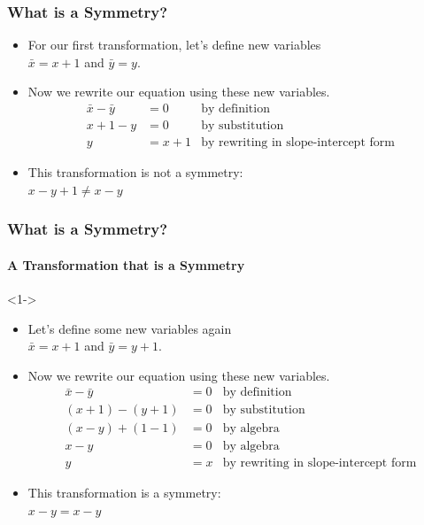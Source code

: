 \documentclass{beamer}
\begin{document}
\begin{frame}
    \frametitle{What is a Symmetry?}
    \begin{example}
        \begin{itemize}
            \item For our first transformation, let's define new variables\\ $\bar{x}=x+1$ and $\bar{y}=y$.
            \item Now we rewrite our equation using these new variables. \begin{equation*}
                \begin{aligned}
                    \bar{x}-\bar{y} &= 0 & \text{by definition} \\
                    x+1-y &= 0 & \text{by substitution} \\
                    y &= x+1 & \text{by rewriting in slope-intercept form}
                \end{aligned}
            \end{equation*}
            \item This transformation is not a symmetry: \\ $x-y+1\ne x-y$
        \end{itemize}        
    \end{example}
\end{frame}


\begin{frame}
    \frametitle{What is a Symmetry?}
    \framesubtitle{A Transformation that is a Symmetry}
    \begin{example}[2]<1->
        \begin{itemize}
            \item Let's define some new variables again\\ $\bar{x}=x+1$ and $\bar{y}=y+1$.
            \item Now we rewrite our equation using these new variables. \begin{equation*}
                \begin{aligned}
                    \bar{x}-\bar{y} &= 0 & \text{by definition} \\
                    (x+1)-(y+1) &= 0 & \text{by substitution} \\
                    (x-y)+(1-1) &= 0 & \text{by algebra} \\
                    x-y &= 0 & \text{by algebra} \\
                    y &= x & \text{by rewriting in slope-intercept form}
                \end{aligned}
            \end{equation*}
            \item This transformation is a symmetry: \\ $x-y = x-y$
        \end{itemize}        
    \end{example}
\end{frame}
\end{document}
